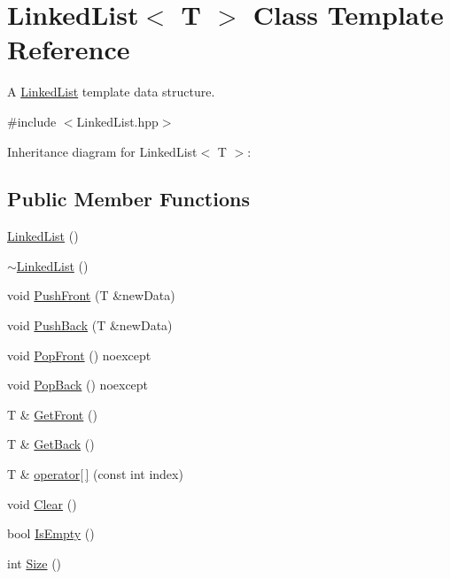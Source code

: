 \hypertarget{classLinkedList}{}\section{Linked\+List$<$ T $>$ Class Template Reference}
\label{classLinkedList}


A \hyperlink{classLinkedList}{Linked\+List} template data structure.  




{\ttfamily \#include $<$Linked\+List.\+hpp$>$}



Inheritance diagram for Linked\+List$<$ T $>$\+:
\subsection*{Public Member Functions}
\begin{DoxyCompactItemize}
\item 
\hyperlink{classLinkedList_a3c20fcfec867e867f541061a09fc640c}{Linked\+List} ()
\item 
\hyperlink{classLinkedList_a7c37609df3b83bc4eb0281b852f93fd7}{$\sim$\+Linked\+List} ()
\item 
void \hyperlink{classLinkedList_a1361893725badfba127ccd62a8217a68}{Push\+Front} (T \&new\+Data)
\item 
void \hyperlink{classLinkedList_a2eaf6d6d9ecefd0136b2072cebfc8332}{Push\+Back} (T \&new\+Data)
\item 
void \hyperlink{classLinkedList_a8db7a458f8f6dc099954b8f1f4e4a2b9}{Pop\+Front} () noexcept
\item 
void \hyperlink{classLinkedList_a437df91b2ce800d56a7eb0eadd0914b3}{Pop\+Back} () noexcept
\item 
T \& \hyperlink{classLinkedList_af3b555a522e02f263eaad90bf1a7283f}{Get\+Front} ()
\item 
T \& \hyperlink{classLinkedList_aeacc5cffbfbf49c339102eec26c109fb}{Get\+Back} ()
\item 
T \& \hyperlink{classLinkedList_a9529ad2025d2c83195c0528c605f92fc}{operator\mbox{[}$\,$\mbox{]}} (const int index)
\item 
void \hyperlink{classLinkedList_ae4a09cb86da66eb74043a5b47b5ac494}{Clear} ()
\item 
bool \hyperlink{classLinkedList_ac5a0d903d22d1157e98b6d3c182e1c74}{Is\+Empty} ()
\item 
int \hyperlink{classLinkedList_a056e945c3c66cf37a8f5c843f983098d}{Size} ()
\end{DoxyCompactItemize}


